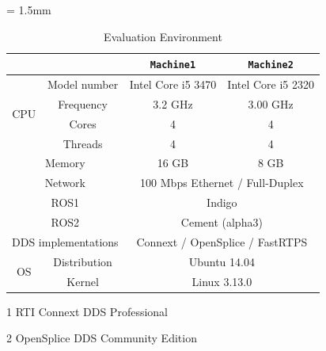 \documentclass{sig-alternate-05-2015}
\begin{document}
\begin{table}[t]
  \caption{Evaluation Environment} 
  \centering
  \begin{threeparttable}
    \renewcommand{\arraystretch}{1.0}
    \label{tb:environment}
    \small
    \tabcolsep = 1.5mm              %
    \begin{tabular}{c|c||c|c}
      \hline
      \multicolumn{2}{c||}{ } & \textbf{\texttt{Machine1}} & \textbf{\texttt{Machine2}} \\ \hline \hline
      \multirow{4}{*}{CPU}   & Model number & Intel Core i5 3470 & Intel Core i5 2320 \\ 
                              & Frequency & 3.2 GHz & 3.00 GHz \\ 
                              & Cores & 4 & 4 \\ 
                              & Threads & 4 & 4 \\ \hline
      \multicolumn{2}{c||}{Memory} & 16 GB & 8 GB \\ \hline 
      \multicolumn{2}{c||}{Network} & \multicolumn{2}{c}{100 Mbps Ethernet / Full-Duplex} \\ \hline
      \multicolumn{2}{c||}{ROS1} & \multicolumn{2}{c}{Indigo} \\ 
      \multicolumn{2}{c||}{ROS2} & \multicolumn{2}{c}{Cement (alpha3)} \\ 
      \multicolumn{2}{c||}{DDS implementations} & \multicolumn{2}{c}{Connext\tnote{1} / OpenSplice\tnote{2} / FastRTPS } \\ \hline 
      \multirow{2}{*}{OS} & Distribution & \multicolumn{2}{c}{Ubuntu 14.04} \\ 
                              & Kernel & \multicolumn{2}{c}{Linux 3.13.0} \\ \hline
    \end{tabular}
    \begin{tablenotes}
    \item[1] RTI Connext DDS Professional \cite{rti_connext}
    \item[2] OpenSplice DDS Community Edition \cite{ospl_dds_community}
    \end{tablenotes}
  \end{threeparttable}
\end{table}
\end{document}

